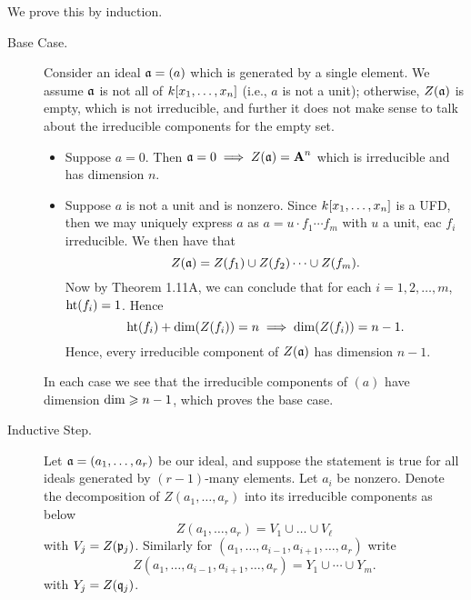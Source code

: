 \documentclass[10pt]{amsart}
\begin{document}
\begin{solution}
    \begin{luke}
    We prove this by induction. 
    \begin{description}
        \item[Base Case.] Consider an ideal $\mathfrak{a} = (a)$ which 
        is generated by a single element. We assume $\mathfrak{a}$ is not all of $k[x_1, \dots, x_n]$ (i.e., $a$ is not a unit);
        otherwise, $Z(\mathfrak{a})$ is empty, which is not irreducible, and further 
        it does not make sense to talk about the irreducible components for the empty set. 
        \begin{itemize}
            \item Suppose $a = 0$. Then $\mathfrak{a} = 0 \implies Z(\mathfrak{a}) = \operatorname{\mathbf{A}}^n$ which is irreducible 
            and has dimension $n$.

            \item Suppose $a$ is not a unit and is nonzero. Since $k[x_1, \dots, x_n]$ is a UFD, then 
            we may uniquely express $a$ as $a = u\cdot f_1 \cdots f_m$ with $u$ a unit, eac 
            $f_i$ irreducible. We then have that 
            \[
                Z(\mathfrak{a}) = Z(f_1) \cup Z(f_2) \cdots \cup Z(f_m).
            \]
            Now by Theorem 1.11A, we can conclude that for each $i= 1, 2, \dots, m$, 
            $\operatorname{\rm{ht}}(f_i) = 1$. Hence 
            \[
                \operatorname{\rm{ht}}(f_i) + \operatorname{\rm{dim}}(Z(f_i)) = n \implies \operatorname{\rm{dim}}(Z(f_i)) = n - 1.
            \]
            Hence, every irreducible component of $Z(\mathfrak{a})$ has dimension $n - 1$.
        \end{itemize}
        In each case we see that the irreducible components of $(a)$ have dimension 
        $\operatorname{\rm{dim}} \geqslant n - 1$, which proves the base case. 

        \item[Inductive Step.]
        Let $\mathfrak{a} = (a_1, \dots, a_r)$ be our ideal, and suppose the statement 
        is true for all ideals generated by $(r-1)$-many elements. Let $a_i$ be nonzero.
        Denote the decomposition of $Z(a_1, \dots, a_r)$ into its irreducible components as below 
        \[
            Z(a_1, \dots, a_r) = V_1 \cup \dots \cup V_{\ell}
        \]
        with $V_j = Z(\mathfrak{p}_j)$.
        Similarly for $(a_1, \dots, a_{i-1}, a_{i+1}, \dots, a_r)$ write
        \[
            Z(a_1, \dots, a_{i-1}, a_{i+1}, \dots, a_r) = Y_1 \cup \cdots \cup Y_m.
        \]
        with $Y_j = Z(\mathfrak{q}_j)$. 


\end{description}
\end{luke}
\end{solution}
\end{document}
